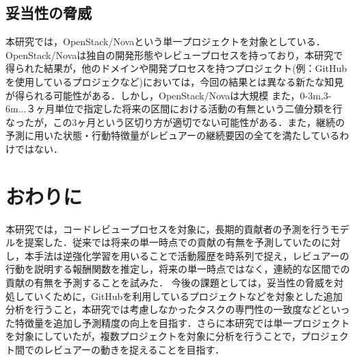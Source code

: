 \documentclass[submit,techrep,noauthor]{ipsj}
\begin{document}
\subsection{妥当性の脅威}
本研究では，OpenStack/Novaという単一プロジェクトを対象としている．OpenStack/Novaは独自の開発形態やレビュープロセスを持っており，本研究で得られた結果が，他のドメインや開発プロセスを持つプロジェクト(例：GitHubを使用しているプロジェクなど)においては，今回の結果とは異なる新たな知見が得られる可能性がある．しかし，OpenStack/Novaは大規模
また，0-3m,3-6m...３ヶ月単位で指定した将来の区間における活動の有無という二値分類を行なったが，この3ヶ月という区切り方が適切でない可能性がある．また，継続の予測に用いた状態・行動特徴量がレビュアーの継続要因の全てを満たしているわけではない．

\section{おわりに}
\label{sec:conclusion}
本研究では，コードレビュープロセスを対象に，長期的貢献者の予測を行うモデルを提案した．従来では将来の単一時点での貢献の有無を予測していたのに対し，本手法は逆強化学習を用いることで活動履歴を時系列で捉え，レビュアーの行動を説明する報酬関数を推定し，将来の単一時点ではなく，連続的な区間での貢献の有無を予測することを試みた．
 今後の課題としては，妥当性の脅威を対処していくために，GitHubを利用しているプロジェクトなどを対象とした追加分析を行うこと，本研究では考慮しなかったタスクの専門性の一致度などといった特徴量を追加し予測精度の向上を目指す．さらに本研究では単一プロジェクトを対象にしていたが，複数プロジェクトを対象に分析を行うことで，プロジェクト間でのレビュアーの動きを捉えることを目指す．




\end{document}
